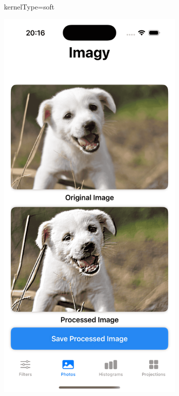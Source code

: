 \documentclass[a4paper]{article}
\begin{document}
\begin{figure}[H]
\begin{subfigure}{0.2\textwidth}
        \caption{kernelType=soft}
        \label{fig:dog_embross_soft}
    \end{subfigure}
    \hfill
    \begin{subfigure}{0.2\textwidth}
        \centering
        \includegraphics[width=\linewidth]{images/dog_embross_default.png}

\end{subfigure}
\end{figure}
\end{document}
